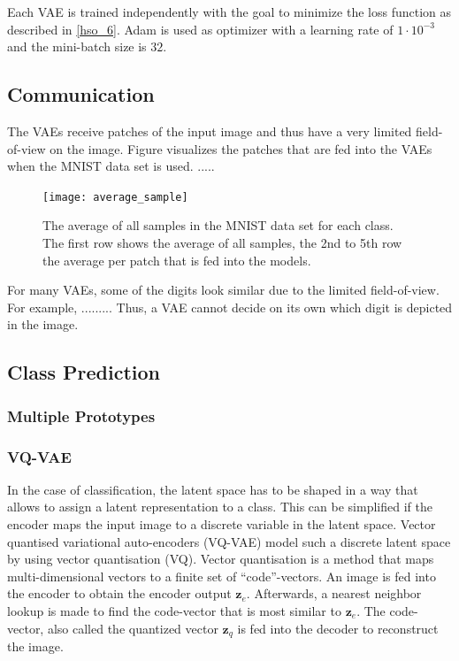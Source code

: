 Each VAE is trained independently with the goal to minimize the loss function as described in \eqref{hso_6}.
Adam  is used as optimizer with a learning rate of $1\cdot 10^{-3}$ and the mini-batch size is $32$.



\subsection{Communication}
The VAEs receive patches of the input image and thus have a very limited field-of-view on the image.
Figure  visualizes the patches that are fed into the VAEs when the MNIST data set \cite{Lecun_Bottou_Bengio_Haffner_1998} is used.
.....


\begin{figure}[h]
    \centering
    \texttt{[image: average\_sample]}
    \caption[Average sample of the MNIST data set per class]{The average of all samples in the MNIST data set for each class. The first row shows the average of all samples, the 2nd to 5th row the average per patch that is fed into the models.}
\end{figure}


For many VAEs, some of the digits look similar due to the limited field-of-view. For example, .........
Thus, a VAE cannot decide on its own which digit is depicted in the image.


\subsection{Class Prediction}

\subsubsection{Multiple Prototypes}


\subsubsection{VQ-VAE}
In the case of classification, the latent space has to be shaped in a way that allows to assign a latent representation to a class.
This can be simplified if the encoder maps the input image to a discrete variable in the latent space.
Vector quantised variational auto-encoders (VQ-VAE)  model such a discrete latent space by using vector quantisation (VQ).
Vector quantisation is a method that maps multi-dimensional vectors to a finite set of ``code''-vectors.
An image is fed into the encoder to obtain the encoder output $\boldsymbol{z}_e$.
Afterwards, a nearest neighbor lookup is made to find the code-vector that is most similar to $\boldsymbol{z}_e$.
The code-vector, also called the quantized vector $\boldsymbol{z}_q$ is fed into the decoder to reconstruct the image.





